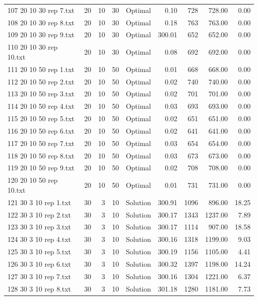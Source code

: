 \begin{longtable}{lrrllrrrr}
107 20 10 30 rep 7.txt & 20 & 10 & 30 & Optimal &  0.10 & 728 & 728.00 &  0.00\\
108 20 10 30 rep 8.txt & 20 & 10 & 30 & Optimal &  0.18 & 763 & 763.00 &  0.00\\
109 20 10 30 rep 9.txt & 20 & 10 & 30 & Optimal & 300.01 & 652 & 652.00 &  0.00\\
110 20 10 30 rep 10.txt & 20 & 10 & 30 & Optimal &  0.08 & 692 & 692.00 &  0.00\\
111 20 10 50 rep 1.txt & 20 & 10 & 50 & Optimal &  0.01 & 668 & 668.00 &  0.00\\
112 20 10 50 rep 2.txt & 20 & 10 & 50 & Optimal &  0.02 & 740 & 740.00 &  0.00\\
113 20 10 50 rep 3.txt & 20 & 10 & 50 & Optimal &  0.02 & 701 & 701.00 &  0.00\\
114 20 10 50 rep 4.txt & 20 & 10 & 50 & Optimal &  0.03 & 693 & 693.00 &  0.00\\
115 20 10 50 rep 5.txt & 20 & 10 & 50 & Optimal &  0.02 & 651 & 651.00 &  0.00\\
116 20 10 50 rep 6.txt & 20 & 10 & 50 & Optimal &  0.02 & 641 & 641.00 &  0.00\\
117 20 10 50 rep 7.txt & 20 & 10 & 50 & Optimal &  0.03 & 654 & 654.00 &  0.00\\
118 20 10 50 rep 8.txt & 20 & 10 & 50 & Optimal &  0.03 & 673 & 673.00 &  0.00\\
119 20 10 50 rep 9.txt & 20 & 10 & 50 & Optimal &  0.02 & 708 & 708.00 &  0.00\\
120 20 10 50 rep 10.txt & 20 & 10 & 50 & Optimal &  0.01 & 731 & 731.00 &  0.00\\
121 30 3 10 rep 1.txt & 30 & 3 & 10 & Solution & 300.91 & 1096 & 896.00 & 18.25\\
122 30 3 10 rep 2.txt & 30 & 3 & 10 & Solution & 300.17 & 1343 & 1237.00 &  7.89\\
123 30 3 10 rep 3.txt & 30 & 3 & 10 & Solution & 300.17 & 1114 & 907.00 & 18.58\\
124 30 3 10 rep 4.txt & 30 & 3 & 10 & Solution & 300.16 & 1318 & 1199.00 &  9.03\\
125 30 3 10 rep 5.txt & 30 & 3 & 10 & Solution & 300.19 & 1156 & 1105.00 &  4.41\\
126 30 3 10 rep 6.txt & 30 & 3 & 10 & Solution & 300.32 & 1397 & 1198.00 & 14.24\\
127 30 3 10 rep 7.txt & 30 & 3 & 10 & Solution & 300.16 & 1304 & 1221.00 &  6.37\\
128 30 3 10 rep 8.txt & 30 & 3 & 10 & Solution & 301.18 & 1280 & 1181.00 &  7.73\\

\end{longtable}
